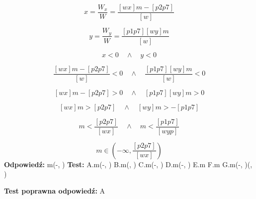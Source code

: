 \documentclass[12pt, a4paper]{article}
\theoremstyle{definition} %
\theoremstyle{definition} %
\newcommand{\rozwStop}{\newline}                                            %
\newcommand{\odpStart}{\noindent \textbf{Odpowiedź:}\newline}    %
\newcommand{\odpStop}{\newline}                                             %
\newcommand{\testStart}{\noindent \textbf{Test:}\newline} %
\newcommand{\testStop}{\newline} %
\newcommand{\kluczStart}{\noindent \textbf{Test poprawna odpowiedź:}\newline} %
\newcommand{\kluczStop}{\newline} %
\begin{document}
$$x=\frac{W_{x}}{W}=\frac{[wx]m-[p2p7]}{[w]}$$

$$y=\frac{W_{y}}{W}=\frac{[p1p7][wy]m}{[w]}$$

$$x<0 \quad \land \quad y<0$$

$$\frac{[wx]m-[p2p7]}{[w]}<0 \quad \land \quad  \frac{[p1p7][wy]m}{[w]}<0$$

$$[wx]m-[p2p7]>0 \quad \land \quad  [p1p7][wy]m>0$$

$$[wx]m>[p2p7] \quad \land \quad [wy]m>-[p1p7]$$

$$m<\frac{[p2p7]}{[wx]} \quad \land \quad m<\frac{[p1p7]}{[wyp]}$$

$$m\in\left(-\infty, \frac{[p2p7]}{[wx]}\right) $$
\rozwStop
\odpStart
m\in\left(-\infty, \frac{[p2p7]}{[wx]}\right)\odpStop
\testStart
A.m\in\left(-\infty, \frac{[p2p7]}{[wx]}\right)
B.m\in\left(\frac{[p2p7]}{[wx]}, \infty\right)
C.m\in\left(-\infty, \frac{[p1p7]}{[wyp]}\right)
D.m\in\left(-\infty, \frac{[p2p7]}{[w]}\right)
E.m\in\emptyset
F.m\in{}
G.m\in\left(-\infty, \frac{[p2p7]}{[wx]}\right)\cup \left(\frac{[p1p7]}{[wyp]}, \infty\right)


\testStop
\kluczStart
A
\kluczStop
\end{document}
